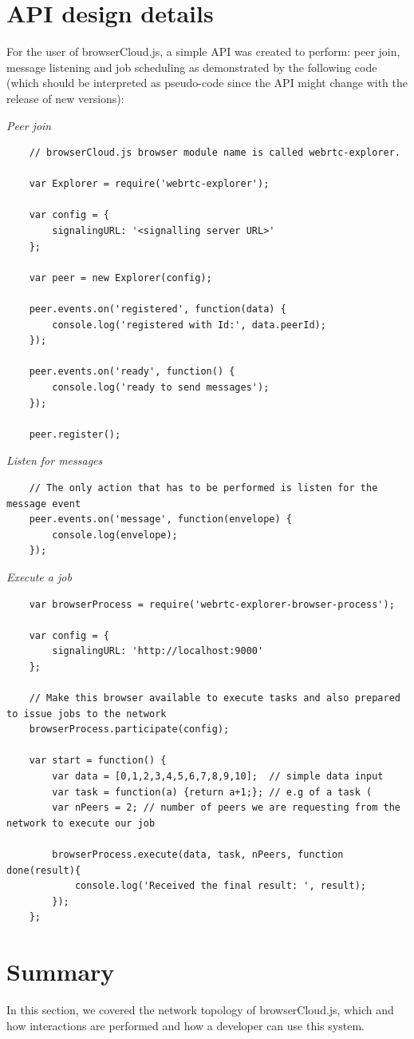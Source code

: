 \section{API design details}

For the user of browserCloud.js, a simple API was created to perform: peer join, message listening and job scheduling as demonstrated by the following code (which should be interpreted as pseudo-code since the API might change with the release of new versions):

\textit{Peer join}
\begingroup
\scriptsize
\begin{verbatim}
    // browserCloud.js browser module name is called webrtc-explorer.

    var Explorer = require('webrtc-explorer'); 
    
    var config = {
        signalingURL: '<signalling server URL>'
    };

    var peer = new Explorer(config);

    peer.events.on('registered', function(data) {
        console.log('registered with Id:', data.peerId);
    });

    peer.events.on('ready', function() {
        console.log('ready to send messages');
    });

    peer.register();
\end{verbatim}
\endgroup


\textit{Listen for messages}
\begingroup
\scriptsize
\begin{verbatim}
    // The only action that has to be performed is listen for the message event 
    peer.events.on('message', function(envelope) {
        console.log(envelope);
    });
\end{verbatim}
\endgroup


\textit{Execute a job}
\begingroup
\scriptsize
\begin{verbatim}
    var browserProcess = require('webrtc-explorer-browser-process');

    var config = {
        signalingURL: 'http://localhost:9000'
    };
    
    // Make this browser available to execute tasks and also prepared to issue jobs to the network
    browserProcess.participate(config);

    var start = function() {
        var data = [0,1,2,3,4,5,6,7,8,9,10];  // simple data input
        var task = function(a) {return a+1;}; // e.g of a task (
        var nPeers = 2; // number of peers we are requesting from the network to execute our job
        
        browserProcess.execute(data, task, nPeers, function done(result){
            console.log('Received the final result: ', result); 
        });
    };
\end{verbatim}
\endgroup

\section{Summary}

In this section, we covered the network topology of browserCloud.js, which and how interactions are performed and how a developer can use this system.
